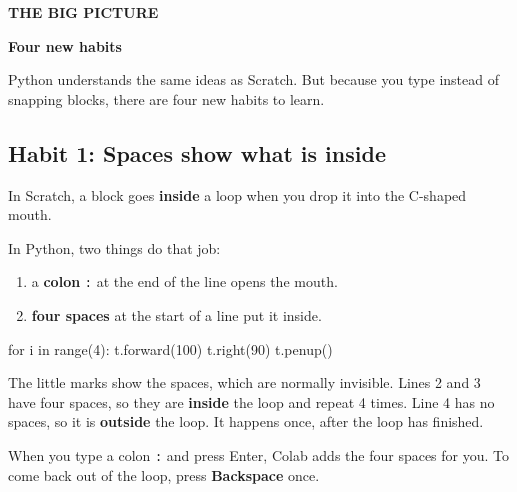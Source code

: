 \documentclass[12pt,a4paper]{article}
\newcommand{\banner}[3]{%
  \clearpage
  \begin{tcolorbox}[enhanced, colback=#1, colframe=#1!80!black, arc=10pt, boxrule=0pt,
    left=14pt, top=10pt, bottom=10pt]
    {\small\bfseries\color{ink}#2}\par\vspace{2pt}
    {\fontsize{26}{30}\selectfont\bfseries\color{ink}#3}
  \end{tcolorbox}
  \addcontentsline{toc}{section}{#3}
  \vspace{4pt}}
\begin{document}
\banner{control}{THE BIG PICTURE}{Four new habits}

Python understands the same ideas as Scratch. But because you type instead of snapping blocks, there are four new habits to learn.

\subsection*{Habit 1: Spaces show what is inside}

In Scratch, a block goes \textbf{inside} a loop when you drop it into the C-shaped mouth.

In Python, two things do that job:
\begin{enumerate}
  \item a \textbf{colon} \texttt{:} at the end of the line opens the mouth.
  \item \textbf{four spaces} at the start of a line put it inside.
\end{enumerate}

\begin{tcbraster}[raster columns=2, raster equal height=rows, raster column skip=12pt, raster valign=center]
\begin{tcolorbox}[colback=white, colframe=white, boxrule=0pt, valign=center]
\begin{scratch}
\end{scratch}
\end{tcolorbox}
\begin{spaces}
for i in range(4):
    t.forward(100)
    t.right(90)
t.penup()
\end{spaces}
\end{tcbraster}

The little \texttt{\textvisiblespace} marks show the spaces, which are normally invisible. Lines 2 and 3 have four spaces, so they are \textbf{inside} the loop and repeat 4 times. Line 4 has no spaces, so it is \textbf{outside} the loop. It happens once, after the loop has finished.

\begin{think}
When you type a colon \texttt{:} and press Enter, Colab adds the four spaces for you. To come back out of the loop, press \textbf{Backspace} once.
\end{think}
\end{document}
